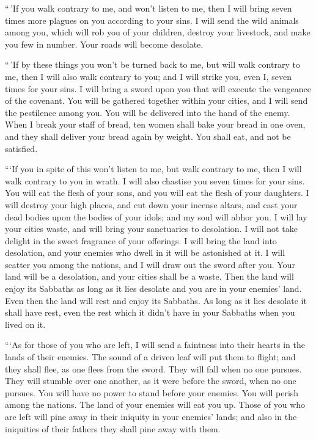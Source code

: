  ``\,'If you walk contrary to me, and won't listen to me,
then I will bring seven times more plagues on you according to your
sins.  I will send the wild animals among you, which will
rob you of your children, destroy your livestock, and make you few in
number. Your roads will become desolate.

 ``\,'If by these things you won't be turned back to me,
but will walk contrary to me,  then I will also walk
contrary to you; and I will strike you, even I, seven times for your
sins.  I will bring a sword upon you that will execute
the vengeance of the covenant. You will be gathered together within your
cities, and I will send the pestilence among you. You will be delivered
into the hand of the enemy.  When I break your staff of
bread, ten women shall bake your bread in one oven, and they shall
deliver your bread again by weight. You shall eat, and not be satisfied.

 ```If you in spite of this won't listen to me, but walk
contrary to me,  then I will walk contrary to you in
wrath. I will also chastise you seven times for your sins.
 You will eat the flesh of your sons, and you will eat
the flesh of your daughters.  I will destroy your high
places, and cut down your incense altars, and cast your dead bodies upon
the bodies of your idols; and my soul will abhor you.  I
will lay your cities waste, and will bring your sanctuaries to
desolation. I will not take delight in the sweet fragrance of your
offerings.  I will bring the land into desolation, and
your enemies who dwell in it will be astonished at it.  I
will scatter you among the nations, and I will draw out the sword after
you. Your land will be a desolation, and your cities shall be a waste.
 Then the land will enjoy its Sabbaths as long as it lies
desolate and you are in your enemies' land. Even then the land will rest
and enjoy its Sabbaths.  As long as it lies desolate it
shall have rest, even the rest which it didn't have in your Sabbaths
when you lived on it.

 ```As for those of you who are left, I will send a
faintness into their hearts in the lands of their enemies. The sound of
a driven leaf will put them to flight; and they shall flee, as one flees
from the sword. They will fall when no one pursues.  They
will stumble over one another, as it were before the sword, when no one
pursues. You will have no power to stand before your enemies.
 You will perish among the nations. The land of your
enemies will eat you up.  Those of you who are left will
pine away in their iniquity in your enemies' lands; and also in the
iniquities of their fathers they shall pine away with them.

